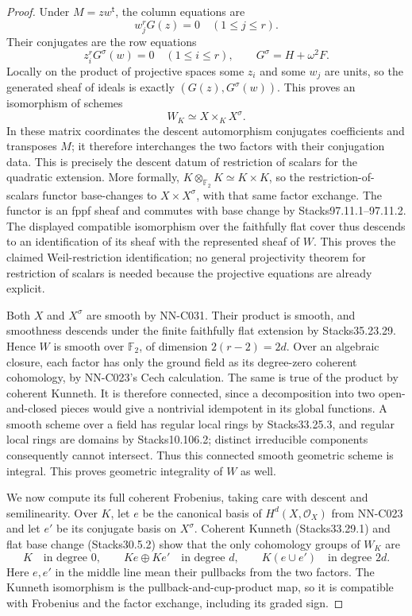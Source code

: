\begin{proof}
Under $M=zw^{\mathsf t}$, the column equations are
\[
                      w_j^rG(z)=0\quad(1\leq j\leq r).
\]
Their conjugates are the row equations
\[
                      z_i^rG^\sigma(w)=0\quad(1\leq i\leq r),
             \qquad G^\sigma=H+\omega^2F.
\]
Locally on the product of projective spaces some $z_i$ and some $w_j$ are units, so the generated sheaf of ideals is exactly $(G(z),G^\sigma(w))$. This proves an isomorphism of schemes
\[
                         W_K\simeq X\times_K X^\sigma.
\]
In these matrix coordinates the descent automorphism conjugates coefficients and transposes $M$; it therefore interchanges the two factors with their conjugation data. This is precisely the descent datum of restriction of scalars for the quadratic extension. More formally, $K\otimes_{\mathbb F_2}K\simeq K\times K$, so the restriction-of-scalars functor base-changes to $X\times X^\sigma$, with that same factor exchange. The functor is an fppf sheaf and commutes with base change by Stacks97.11.1--97.11.2. The displayed compatible isomorphism over the faithfully flat cover thus descends to an identification of its sheaf with the represented sheaf of $W$. This proves the claimed Weil-restriction identification; no general projectivity theorem for restriction of scalars is needed because the projective equations are already explicit.

Both $X$ and $X^\sigma$ are smooth by NN-C031. Their product is smooth, and smoothness descends under the finite faithfully flat extension by Stacks35.23.29. Hence $W$ is smooth over $\mathbb F_2$, of dimension $2(r-2)=2d$. Over an algebraic closure, each factor has only the ground field as its degree-zero coherent cohomology, by NN-C023's Cech calculation. The same is true of the product by coherent Kunneth. It is therefore connected, since a decomposition into two open-and-closed pieces would give a nontrivial idempotent in its global functions. A smooth scheme over a field has regular local rings by Stacks33.25.3, and regular local rings are domains by Stacks10.106.2; distinct irreducible components consequently cannot intersect. Thus this connected smooth geometric scheme is integral. This proves geometric integrality of $W$ as well.

We now compute its full coherent Frobenius, taking care with descent and semilinearity. Over $K$, let $e$ be the canonical basis of $H^d(X,\mathcal O_X)$ from NN-C023 and let $e'$ be its conjugate basis on $X^\sigma$. Coherent Kunneth (Stacks33.29.1) and flat base change (Stacks30.5.2) show that the only cohomology groups of $W_K$ are
\[
 K\quad\text{in degree }0,\qquad
 Ke\oplus Ke'\quad\text{in degree }d,\qquad
 K(e\mathbin\cup e')\quad\text{in degree }2d.
\]
Here $e,e'$ in the middle line mean their pullbacks from the two factors. The Kunneth isomorphism is the pullback-and-cup-product map, so it is compatible with Frobenius and the factor exchange, including its graded sign.


\end{proof}
